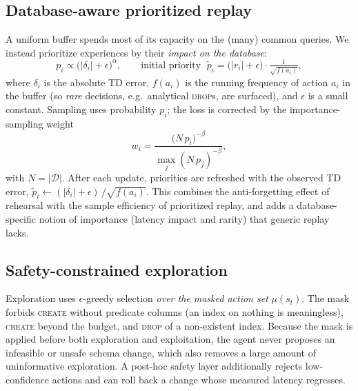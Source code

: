\subsection{Database-aware prioritized replay}
A uniform buffer spends most of its capacity on the (many) common queries. We
instead prioritize experiences by their \emph{impact on the database}:
\begin{equation}
  p_i \propto \big(|\delta_i|+\epsilon\big)^{\alpha},
  \qquad
  \text{initial priority } \; \tilde p_i = \big(|r_i|+\epsilon\big)\cdot
      \tfrac{1}{\sqrt{f(a_i)}},
  \label{eq:priority}
\end{equation}
where \(\delta_i\) is the absolute TD error, \(f(a_i)\) is the running frequency
of action \(a_i\) in the buffer (so \emph{rare} decisions, e.g.\ analytical
\textsc{drop}s, are surfaced), and \(\epsilon\) is a small constant. Sampling uses
probability \(p_i\); the loss is corrected by the importance-sampling weight
\begin{equation}
  w_i = \frac{\big(N\,p_i\big)^{-\beta}}{\max_j (N\,p_j)^{-\beta}},
  \label{eq:is}
\end{equation}
with \(N=|\mathcal{D}|\). After each update, priorities are refreshed with the
observed TD error, \(\tilde p_i \leftarrow (|\delta_i|+\epsilon)\,/\sqrt{f(a_i)}\).
This combines the anti-forgetting effect of rehearsal with the sample efficiency
of prioritized replay, and adds a database-specific notion of importance (latency
impact and rarity) that generic replay lacks.

\subsection{Safety-constrained exploration}
Exploration uses \(\epsilon\)-greedy selection \emph{over the masked action set}
\(\mu(s_t)\). The mask forbids \textsc{create} without predicate columns (an index
on nothing is meaningless), \textsc{create} beyond the budget, and \textsc{drop}
of a non-existent index. Because the mask is applied before both exploration and
exploitation, the agent never proposes an infeasible or unsafe schema change,
which also removes a large amount of uninformative exploration. A post-hoc safety
layer additionally rejects low-confidence actions and can roll back a change whose
measured latency regresses.


